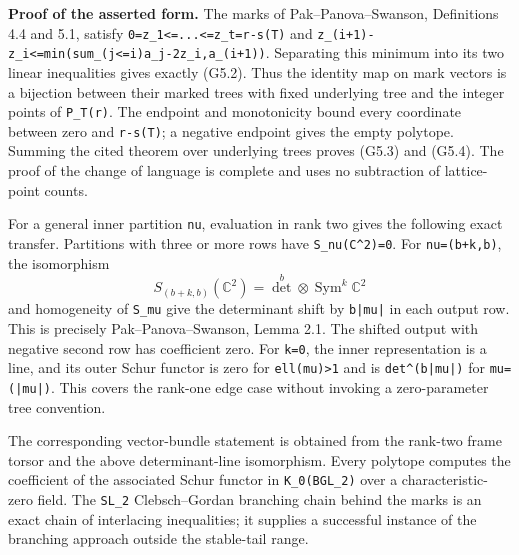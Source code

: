 \documentclass[
  10pt,
]{article}
\begin{document}
\textbf{Proof of the asserted form.} The marks of Pak--Panova--Swanson,
Definitions 4.4 and 5.1, satisfy
\texttt{\small 0=\allowbreak{}z\_\allowbreak{}1<=\allowbreak{}...<=\allowbreak{}z\_\allowbreak{}t=\allowbreak{}r-\allowbreak{}s(\allowbreak{}T)\allowbreak{}}
and
\texttt{\small z\_\allowbreak{}(\allowbreak{}i+\allowbreak{}1)\allowbreak{}-\allowbreak{}z\_\allowbreak{}i<=\allowbreak{}min(\allowbreak{}sum\_\allowbreak{}(\allowbreak{}j<=\allowbreak{}i)\allowbreak{}a\_\allowbreak{}j-\allowbreak{}2z\_\allowbreak{}i,\allowbreak{}a\_\allowbreak{}(\allowbreak{}i+\allowbreak{}1)\allowbreak{})\allowbreak{}}.
Separating this minimum into its two linear inequalities gives exactly
(G5.2). Thus the identity map on mark vectors is a bijection between
their marked trees with fixed underlying tree and the integer points of
\texttt{\small P\_\allowbreak{}T(\allowbreak{}r)\allowbreak{}}. The
endpoint and monotonicity bound every coordinate between zero and
\texttt{\small r-\allowbreak{}s(\allowbreak{}T)\allowbreak{}}; a
negative endpoint gives the empty polytope. Summing the cited theorem
over underlying trees proves (G5.3) and (G5.4). The proof of the change
of language is complete and uses no subtraction of lattice-point counts.

For a general inner partition \texttt{\small nu}, evaluation in rank two
gives the following exact transfer. Partitions with three or more rows
have
\texttt{\small S\_\allowbreak{}nu(\allowbreak{}C\textasciicircum{}2)\allowbreak{}=\allowbreak{}0}.
For
\texttt{\small nu=\allowbreak{}(\allowbreak{}b+\allowbreak{}k,\allowbreak{}b)\allowbreak{}},
the isomorphism \[
S_{(b+k,b)}(\mathbb C^2)=\det^b\otimes\operatorname{Sym}^k\mathbb C^2
\] and homogeneity of \texttt{\small S\_\allowbreak{}mu} give the
determinant shift by \texttt{\small b|mu|} in each output row. This is
precisely Pak--Panova--Swanson, Lemma 2.1. The shifted output with
negative second row has coefficient zero. For
\texttt{\small k=\allowbreak{}0}, the inner representation is a line,
and its outer Schur functor is zero for
\texttt{\small ell(\allowbreak{}mu)\allowbreak{}>1} and is
\texttt{\small det\textasciicircum{}(\allowbreak{}b|mu|)\allowbreak{}}
for \texttt{\small mu=\allowbreak{}(\allowbreak{}|mu|)\allowbreak{}}.
This covers the rank-one edge case without invoking a zero-parameter
tree convention.

The corresponding vector-bundle statement is obtained from the rank-two
frame torsor and the above determinant-line isomorphism. Every polytope
computes the coefficient of the associated Schur functor in
\texttt{\small K\_\allowbreak{}0(\allowbreak{}BGL\_\allowbreak{}2)\allowbreak{}}
over a characteristic-zero field. The \texttt{\small SL\_\allowbreak{}2}
Clebsch--Gordan branching chain behind the marks is an exact chain of
interlacing inequalities; it supplies a successful instance of the
branching approach outside the stable-tail range.
\end{document}
